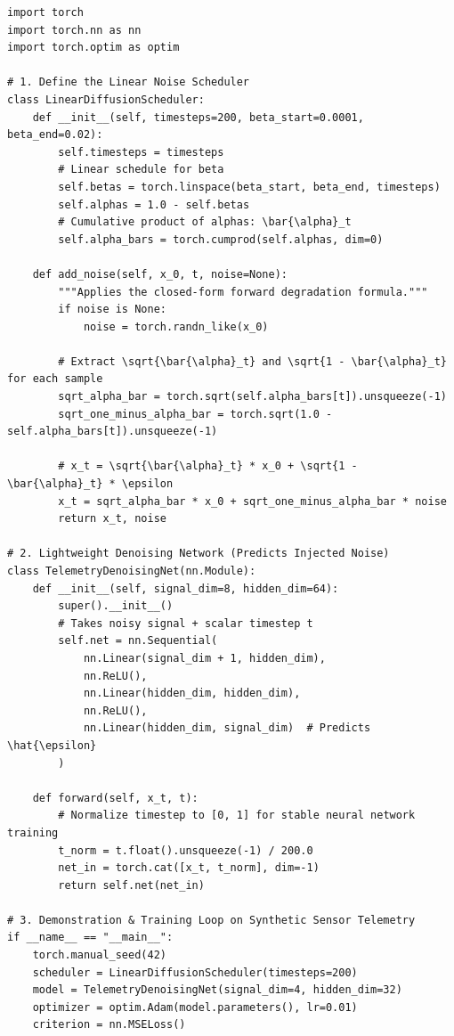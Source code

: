 \begin{lstlisting}[style=pythonstyle, caption={Implementation of a DDPM linear noise scheduler and toy 1D denoising model in PyTorch.}, label={lst:diffusion_ddpm}]
import torch
import torch.nn as nn
import torch.optim as optim

# 1. Define the Linear Noise Scheduler
class LinearDiffusionScheduler:
    def __init__(self, timesteps=200, beta_start=0.0001, beta_end=0.02):
        self.timesteps = timesteps
        # Linear schedule for beta
        self.betas = torch.linspace(beta_start, beta_end, timesteps)
        self.alphas = 1.0 - self.betas
        # Cumulative product of alphas: \bar{\alpha}_t
        self.alpha_bars = torch.cumprod(self.alphas, dim=0)

    def add_noise(self, x_0, t, noise=None):
        """Applies the closed-form forward degradation formula."""
        if noise is None:
            noise = torch.randn_like(x_0)
        
        # Extract \sqrt{\bar{\alpha}_t} and \sqrt{1 - \bar{\alpha}_t} for each sample
        sqrt_alpha_bar = torch.sqrt(self.alpha_bars[t]).unsqueeze(-1)
        sqrt_one_minus_alpha_bar = torch.sqrt(1.0 - self.alpha_bars[t]).unsqueeze(-1)
        
        # x_t = \sqrt{\bar{\alpha}_t} * x_0 + \sqrt{1 - \bar{\alpha}_t} * \epsilon
        x_t = sqrt_alpha_bar * x_0 + sqrt_one_minus_alpha_bar * noise
        return x_t, noise

# 2. Lightweight Denoising Network (Predicts Injected Noise)
class TelemetryDenoisingNet(nn.Module):
    def __init__(self, signal_dim=8, hidden_dim=64):
        super().__init__()
        # Takes noisy signal + scalar timestep t
        self.net = nn.Sequential(
            nn.Linear(signal_dim + 1, hidden_dim),
            nn.ReLU(),
            nn.Linear(hidden_dim, hidden_dim),
            nn.ReLU(),
            nn.Linear(hidden_dim, signal_dim)  # Predicts \hat{\epsilon}
        )

    def forward(self, x_t, t):
        # Normalize timestep to [0, 1] for stable neural network training
        t_norm = t.float().unsqueeze(-1) / 200.0
        net_in = torch.cat([x_t, t_norm], dim=-1)
        return self.net(net_in)

# 3. Demonstration & Training Loop on Synthetic Sensor Telemetry
if __name__ == "__main__":
    torch.manual_seed(42)
    scheduler = LinearDiffusionScheduler(timesteps=200)
    model = TelemetryDenoisingNet(signal_dim=4, hidden_dim=32)
    optimizer = optim.Adam(model.parameters(), lr=0.01)
    criterion = nn.MSELoss()


\end{lstlisting}
